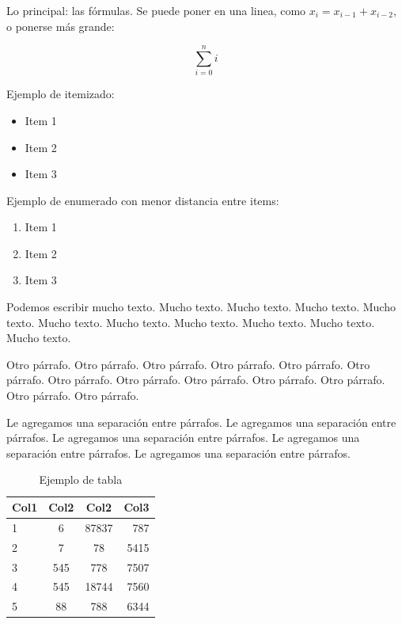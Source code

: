 \documentclass[10pt,a4paper]{article}
\begin{document}
\maketitle

Lo principal: las fórmulas. Se puede poner en una linea, como $x_i = x_{i-1} + x_{i-2}$, o ponerse más grande:

\begin{equation}
	\sum\limits_{i=0}^{n} i
	\label{eq:1}
\end{equation}


Ejemplo de itemizado:

\begin{itemize}
	\item Item 1
	\item Item 2
	\item Item 3
\end{itemize}

Ejemplo de enumerado con menor distancia entre items:

\begin{enumerate} \setlength\itemsep{0cm}
	\item Item 1
	\item Item 2
	\item Item 3
\end{enumerate}

Podemos escribir mucho texto. Mucho texto. Mucho texto. Mucho texto. Mucho texto. Mucho texto. Mucho texto. Mucho texto. Mucho texto. Mucho texto. Mucho texto.

Otro párrafo. Otro párrafo. Otro párrafo. Otro párrafo. Otro párrafo. Otro párrafo. Otro párrafo. Otro párrafo. Otro párrafo. Otro párrafo. Otro párrafo. Otro párrafo. Otro párrafo.

\vspace{0.3cm}

Le agregamos una separación entre párrafos. Le agregamos una separación entre párrafos. Le agregamos una separación entre párrafos. Le agregamos una separación entre párrafos. Le agregamos una separación entre párrafos.

\vspace{0.3cm}


\begin{table}[h!]
	\centering
	\begin{tabular}{||l c c r||} 
		\hline
		Col1 & Col2 & Col2 & Col3 \\ [0.5ex] 
		\hline\hline
		1 & 6 & 87837 & 787 \\ 
		2 & 7 & 78 & 5415 \\
		3 & 545 & 778 & 7507 \\
		4 & 545 & 18744 & 7560 \\
		5 & 88 & 788 & 6344 \\
		\hline
	\end{tabular}
	\caption{Ejemplo de tabla}
	\label{tab:ejemplo}
\end{table}
\end{document}
